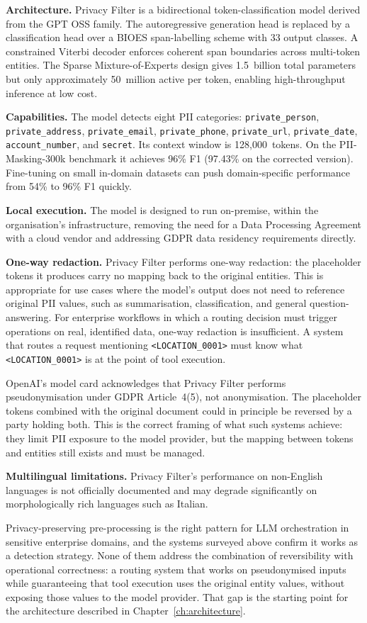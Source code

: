\textbf{Architecture.} Privacy Filter is a bidirectional token-classification model derived from the GPT OSS family. The autoregressive generation head is replaced by a classification head over a BIOES span-labelling scheme with 33 output classes. A constrained Viterbi decoder enforces coherent span boundaries across multi-token entities. The Sparse Mixture-of-Experts design gives 1.5~billion total parameters but only approximately 50~million active per token, enabling high-throughput inference at low cost.

\textbf{Capabilities.} The model detects eight PII categories: \texttt{private\_person}, \texttt{private\_address}, \texttt{private\_email}, \texttt{private\_phone}, \texttt{private\_url}, \texttt{private\_date}, \texttt{account\_number}, and \texttt{secret}. Its context window is 128,000~tokens. On the PII-Masking-300k benchmark it achieves 96\% F1 (97.43\% on the corrected version). Fine-tuning on small in-domain datasets can push domain-specific performance from 54\% to 96\% F1 quickly.

\textbf{Local execution.} The model is designed to run on-premise, within the organisation's infrastructure, removing the need for a Data Processing Agreement with a cloud vendor and addressing GDPR data residency requirements directly.

\textbf{One-way redaction.} Privacy Filter performs one-way redaction: the placeholder tokens it produces carry no mapping back to the original entities. This is appropriate for use cases where the model's output does not need to reference original PII values, such as summarisation, classification, and general question-answering. For enterprise workflows in which a routing decision must trigger operations on real, identified data, one-way redaction is insufficient. A system that routes a request mentioning \texttt{<LOCATION\_0001>} must know what \texttt{<LOCATION\_0001>} is at the point of tool execution.

OpenAI's model card acknowledges that Privacy Filter performs pseudonymisation under GDPR Article~4(5), not anonymisation. The placeholder tokens combined with the original document could in principle be reversed by a party holding both. This is the correct framing of what such systems achieve: they limit PII exposure to the model provider, but the mapping between tokens and entities still exists and must be managed.

\textbf{Multilingual limitations.} Privacy Filter's performance on non-English languages is not officially documented and may degrade significantly on morphologically rich languages such as Italian.

Privacy-preserving pre-processing is the right pattern for LLM orchestration in sensitive enterprise domains, and the systems surveyed above confirm it works as a detection strategy. None of them address the combination of reversibility with operational correctness: a routing system that works on pseudonymised inputs while guaranteeing that tool execution uses the original entity values, without exposing those values to the model provider. That gap is the starting point for the architecture described in Chapter~\ref{ch:architecture}.

